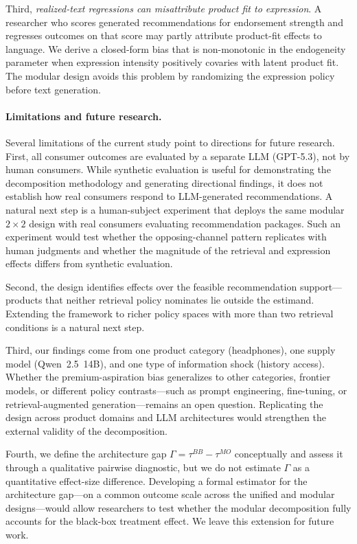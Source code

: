 \documentclass[11pt]{article}
\begin{document}
Third, \emph{realized-text regressions can misattribute product fit to expression}. A researcher who scores generated recommendations for endorsement strength and regresses outcomes on that score may partly attribute product-fit effects to language. We derive a closed-form bias that is non-monotonic in the endogeneity parameter when expression intensity positively covaries with latent product fit. The modular design avoids this problem by randomizing the expression policy before text generation.

\paragraph{Limitations and future research.}
Several limitations of the current study point to directions for future research. First, all consumer outcomes are evaluated by a separate LLM (GPT-5.3), not by human consumers. While synthetic evaluation is useful for demonstrating the decomposition methodology and generating directional findings, it does not establish how real consumers respond to LLM-generated recommendations. A natural next step is a human-subject experiment that deploys the same modular $2 \times 2$ design with real consumers evaluating recommendation packages. Such an experiment would test whether the opposing-channel pattern replicates with human judgments and whether the magnitude of the retrieval and expression effects differs from synthetic evaluation.

Second, the design identifies effects over the feasible recommendation support---products that neither retrieval policy nominates lie outside the estimand. Extending the framework to richer policy spaces with more than two retrieval conditions is a natural next step.

Third, our findings come from one product category (headphones), one supply model (Qwen~2.5~14B), and one type of information shock (history access). Whether the premium-aspiration bias generalizes to other categories, frontier models, or different policy contrasts---such as prompt engineering, fine-tuning, or retrieval-augmented generation---remains an open question. Replicating the design across product domains and LLM architectures would strengthen the external validity of the decomposition.

Fourth, we define the architecture gap $\Gamma = \tau^{BB} - \tau^{MO}$ conceptually and assess it through a qualitative pairwise diagnostic, but we do not estimate $\Gamma$ as a quantitative effect-size difference. Developing a formal estimator for the architecture gap---on a common outcome scale across the unified and modular designs---would allow researchers to test whether the modular decomposition fully accounts for the black-box treatment effect. We leave this extension for future work.
\end{document}
